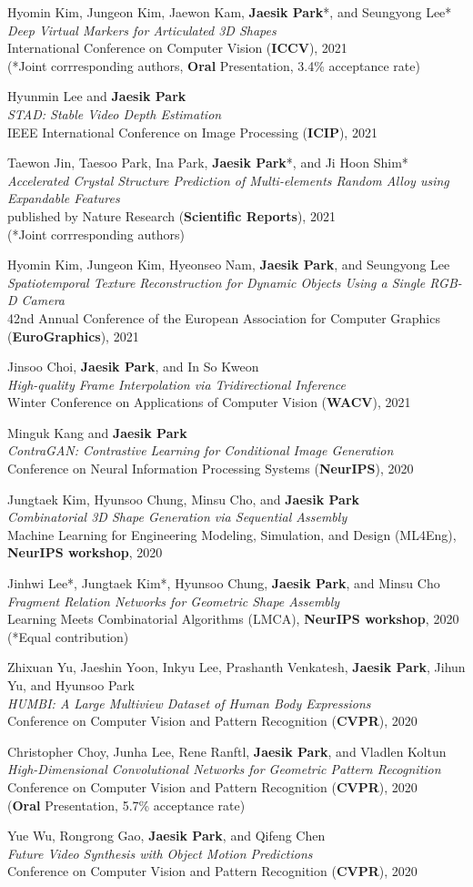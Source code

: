\documentclass[letterpaper,11pt]{article}
\newcommand{\publicationItem}[4]{
  \small{
  \item{#1\\ \emph{#2}\\ #3\\ #4}
  }
}
\begin{document}
    \publicationItem{Hyomin Kim, Jungeon Kim, Jaewon Kam, \textbf{Jaesik Park}*, and Seungyong Lee*}{Deep Virtual Markers for Articulated 3D Shapes}{International Conference on Computer Vision (\textbf{ICCV}), 2021}{(*Joint corrresponding authors, \textbf{Oral} Presentation, 3.4\% acceptance rate)}
    \publicationItem{Hyunmin Lee and \textbf{Jaesik Park}}{STAD: Stable Video Depth Estimation}{IEEE International Conference on Image Processing (\textbf{ICIP}), 2021}{}
    \publicationItem{Taewon Jin, Taesoo Park, Ina Park, \textbf{Jaesik Park}*, and Ji Hoon Shim*}{Accelerated Crystal Structure Prediction of Multi-elements Random Alloy using Expandable Features}{published by Nature Research (\textbf{Scientific Reports}), 2021}{(*Joint corrresponding authors)}
    \publicationItem{Hyomin Kim, Jungeon Kim, Hyeonseo Nam, \textbf{Jaesik Park}, and Seungyong Lee}{Spatiotemporal Texture Reconstruction for Dynamic Objects Using a Single RGB-D Camera}{42nd Annual Conference of the European Association for Computer Graphics (\textbf{EuroGraphics}), 2021}{}
    \publicationItem{Jinsoo Choi, \textbf{Jaesik Park}, and In So Kweon}{High-quality Frame Interpolation via Tridirectional Inference}{Winter Conference on Applications of Computer Vision (\textbf{WACV}), 2021}{}
    \publicationItem{Minguk Kang and \textbf{Jaesik Park}}{ContraGAN: Contrastive Learning for Conditional Image Generation}{Conference on Neural Information Processing Systems (\textbf{NeurIPS}), 2020}{}
    \publicationItem{Jungtaek Kim, Hyunsoo Chung, Minsu Cho, and \textbf{Jaesik Park}}{Combinatorial 3D Shape Generation via Sequential Assembly}{Machine Learning for Engineering Modeling, Simulation, and Design (ML4Eng), \textbf{NeurIPS workshop}, 2020}{}
    \publicationItem{Jinhwi Lee*, Jungtaek Kim*, Hyunsoo Chung, \textbf{Jaesik Park}, and Minsu Cho}{Fragment Relation Networks for Geometric Shape Assembly}{Learning Meets Combinatorial Algorithms (LMCA), \textbf{NeurIPS workshop}, 2020}{(*Equal contribution)}
    \publicationItem{Zhixuan Yu, Jaeshin Yoon, Inkyu Lee, Prashanth Venkatesh, \textbf{Jaesik Park}, Jihun Yu, and Hyunsoo Park}{HUMBI: A Large Multiview Dataset of Human Body Expressions}{Conference on Computer Vision and Pattern Recognition (\textbf{CVPR}), 2020}{}
    \publicationItem{Christopher Choy, Junha Lee, Rene Ranftl, \textbf{Jaesik Park}, and Vladlen Koltun}{High-Dimensional Convolutional Networks for Geometric Pattern Recognition}{Conference on Computer Vision and Pattern Recognition (\textbf{CVPR}), 2020}{(\textbf{Oral} Presentation, 5.7\% acceptance rate)}
    \publicationItem{Yue Wu, Rongrong Gao, \textbf{Jaesik Park}, and Qifeng Chen}{Future Video Synthesis with Object Motion Predictions}{Conference on Computer Vision and Pattern Recognition (\textbf{CVPR}), 2020}{}
\end{document}
